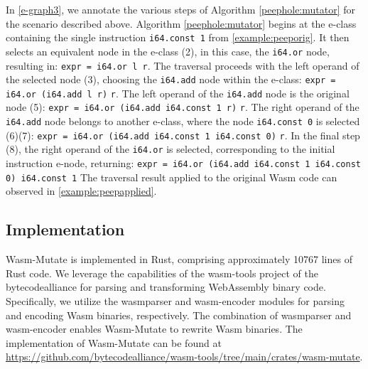 \documentclass[sigplan,screen]{acmart}
\newcommand*\badge[1]{ \colorbox{red}{\color{white}#1}}
\newcommand{\tool}{{\sc Wasm-Mutate}\xspace}
\newcommand{\repourl}{\url{https://github.com/bytecodealliance/wasm-tools/tree/main/crates/wasm-mutate}}
\newcommand{\todo}[1]{%
\refstepcounter{todo}
\noindent\textbf{\badge{TODO}} {\color{red}#1}
\addcontentsline{td}{todo}
{\color{red}\thesection.\thetodo\xspace #1}}
\begin{document}
In \autoref{e-graph3}, we annotate the various steps of Algorithm \ref{peephole:mutator} 
for the scenario  described above. Algorithm \ref{peephole:mutator} begins at the e-class containing the single instruction \texttt{i64.const 1} from \autoref{example:peeporig}. 
It then selects an equivalent node in the e-class (2), in this case, the \texttt{i64.or} node, resulting in:
{\texttt{expr = i64.or l r}}.
The traversal proceeds with the left operand of the selected node (3), choosing the \texttt{i64.add} node within the e-class: 
{\texttt{expr = i64.or (i64.add l r)} \texttt{r}}.
The left operand of the \texttt{i64.add} node is the original node (5): 
{\texttt{expr = i64.or (i64.add i64.const 1 r)} \texttt{r}}.
The right operand of the \texttt{i64.add} node belongs to another e-class, where the node \texttt{i64.const 0} is selected (6)(7):
{\texttt{expr = i64.or (i64.add i64.const 1 i64.const 0)} \texttt{r}}.
In the final step (8), the right operand of the \texttt{i64.or} is selected, corresponding to the initial instruction e-node, returning:
{\texttt{expr = i64.or (i64.add i64.const 1 i64.const 0)\ i64.const 1}}
The traversal result applied to the original Wasm code can observed in \autoref{example:peepapplied}. 

\subsection{Implementation}

\tool is implemented in Rust, comprising approximately 10767 lines of Rust code. 
We leverage the capabilities of the wasm-tools project of the bytecodealliance for parsing and transforming WebAssembly binary code. 
Specifically, we utilize the wasmparser and wasm-encoder modules for parsing and encoding Wasm binaries, respectively.
The combination of wasmparser and wasm-encoder enables \tool to rewrite Wasm binaries. 
The implementation of \tool can be found at \repourl.




\end{document}
